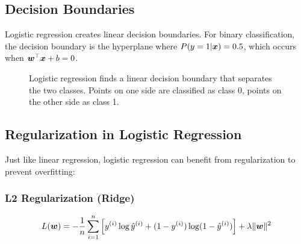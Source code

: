 \subsection{Decision Boundaries}

Logistic regression creates linear decision boundaries. For binary classification, the decision boundary is the hyperplane where $P(y=1|\boldsymbol{x}) = 0.5$, which occurs when $\boldsymbol{w}^\top \boldsymbol{x} + b = 0$.

\begin{figure}[htbp]
\centering
{}
\caption{Logistic regression finds a linear decision boundary that separates the two classes. Points on one side are classified as class 0, points on the other side as class 1.}
\label{fig:logistic-decision-boundary}
\end{figure}

\subsection{Regularization in Logistic Regression}

Just like linear regression, logistic regression can benefit from regularization to prevent overfitting:

\subsubsection{L2 Regularization (Ridge)}

\begin{equation}
L(\boldsymbol{w}) = -\frac{1}{n} \sum_{i=1}^{n} \left[y^{(i)} \log \hat{y}^{(i)} + (1-y^{(i)}) \log(1-\hat{y}^{(i)})\right] + \lambda \|\boldsymbol{w}\|^2
\end{equation}

